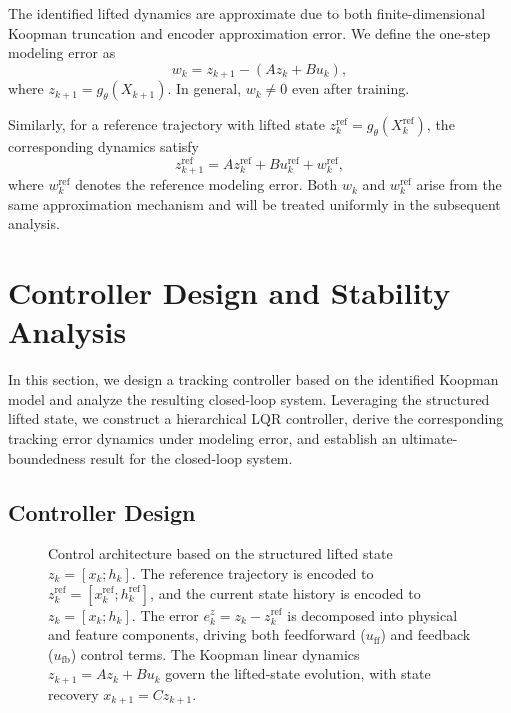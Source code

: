 \documentclass[journal]{IEEEtran}
\begin{document}
The identified lifted dynamics are approximate due to both finite-dimensional Koopman truncation and encoder approximation error. We define the one-step modeling error as
\begin{equation}
    w_k = z_{k+1} - (A z_k + B u_k),
    \label{eq:modeling_error}
\end{equation}
where $z_{k+1} = g_\theta(X_{k+1})$. In general, $w_k \neq 0$ even after training.

Similarly, for a reference trajectory with lifted state $z_k^{\mathrm{ref}} = g_\theta(X_k^{\mathrm{ref}})$, the corresponding dynamics satisfy
\begin{equation}
    z_{k+1}^{\mathrm{ref}} = A z_k^{\mathrm{ref}} + B u_k^{\mathrm{ref}} + w_k^{\mathrm{ref}},
    \label{eq:ref_error}
\end{equation}
where $w_k^{\mathrm{ref}}$ denotes the reference modeling error. Both $w_k$ and $w_k^{\mathrm{ref}}$ arise from the same approximation mechanism and will be treated uniformly in the subsequent analysis.

\section{Controller Design and Stability Analysis}
\label{sec:control}

In this section, we design a tracking controller based on the identified Koopman model and analyze the resulting closed-loop system. Leveraging the structured lifted state, we construct a hierarchical LQR controller, derive the corresponding tracking error dynamics under modeling error, and establish an ultimate-boundedness result for the closed-loop system.

\subsection{Controller Design}
\label{subsec:controller_design}

\begin{figure}[!t]
    \centering
    \caption{Control architecture based on the structured lifted state $z_k=[x_k;h_k]$. The reference trajectory is encoded to $z_k^{\mathrm{ref}}=[x_k^{\mathrm{ref}};h_k^{\mathrm{ref}}]$, and the current state history is encoded to $z_k=[x_k;h_k]$. The error $e_k^z = z_k - z_k^{\mathrm{ref}}$ is decomposed into physical and feature components, driving both feedforward ($u_{\mathrm{ff}}$) and feedback ($u_{\mathrm{fb}}$) control terms. The Koopman linear dynamics $z_{k+1}=Az_k+Bu_k$ govern the lifted-state evolution, with state recovery $x_{k+1}=Cz_{k+1}$.}
    \label{fig:control_architecture}
\end{figure}
\end{document}
